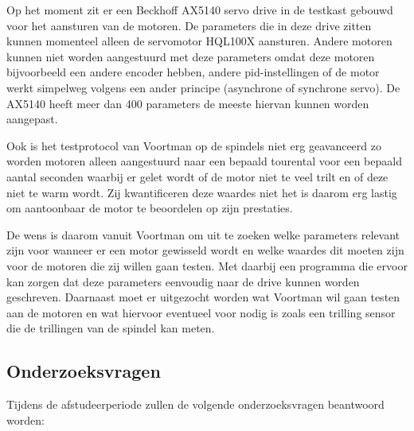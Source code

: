 Op het moment zit er een Beckhoff \gls{AX5140} servo drive in de testkast gebouwd voor het aansturen van de motoren. De parameters die in deze drive zitten kunnen momenteel alleen de servomotor HQL100X aansturen. Andere motoren kunnen niet worden aangestuurd met deze parameters omdat deze motoren bijvoorbeeld een andere encoder hebben, andere \gls{pid}-instellingen of de motor werkt simpelweg volgens een ander principe (asynchrone of synchrone servo). De \gls{AX5140} heeft meer dan 400 parameters de meeste hiervan kunnen worden aangepast.

\vspace{1cm}

Ook is het testprotocol van Voortman op de spindels niet erg geavanceerd zo worden motoren alleen aangestuurd naar een bepaald tourental voor een bepaald aantal seconden waarbij er gelet wordt of de motor niet te veel trilt en of deze niet te warm wordt. Zij kwantificeren deze waardes niet het is daarom erg lastig om aantoonbaar de motor te beoordelen op zijn prestaties.

\vspace{1cm}

De wens is daarom vanuit Voortman om uit te zoeken welke parameters relevant zijn voor wanneer er een motor gewisseld wordt en welke waardes dit moeten zijn voor de motoren die zij willen gaan testen. Met daarbij een programma die ervoor kan zorgen dat deze parameters eenvoudig naar de drive kunnen worden geschreven. Daarnaast moet er uitgezocht worden wat Voortman wil gaan testen aan de motoren en wat hiervoor eventueel voor nodig is zoals een trilling sensor die de trillingen van de spindel kan meten.

\newpage

\subsection{Onderzoeksvragen}

Tijdens de afstudeerperiode zullen de volgende onderzoeksvragen beantwoord worden:

